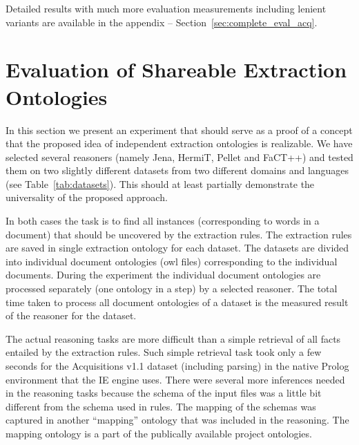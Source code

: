 Detailed results with much more evaluation measurements including lenient variants are available in the appendix -- Section~\ref{sec:complete_eval_acq}.






\section{Evaluation of Shareable Extraction Ontologies}  \label{sec:onto_experiment}

In this section we present an experiment that should serve as a proof of a concept that the proposed idea of independent extraction ontologies is realizable. We have selected several reasoners (namely Jena, HermiT, Pellet and FaCT++) and tested them on two slightly different datasets from two different domains and languages (see Table~\ref{tab:datasets}). This should at least partially demonstrate the universality of the proposed approach.

In both cases the task is to find all instances (corresponding to words in a document) that should be uncovered by the extraction rules. The extraction rules are saved in single extraction ontology for each dataset. The datasets are divided into individual document ontologies (owl files) corresponding to the individual documents. During the experiment the individual document ontologies are processed separately (one ontology in a step) by a selected reasoner. The total time taken to process all document ontologies of a dataset is the measured result of the reasoner for the dataset.

The actual reasoning tasks are more difficult than a simple retrieval of all facts entailed by the extraction rules. Such simple retrieval task took only a few seconds for the Acquisitions v1.1 dataset (including parsing) in the native Prolog environment that the IE engine uses. There were several more inferences needed in the reasoning tasks because the schema of the input files was a little bit different from the schema used in rules. The mapping of the schemas was captured in another ``mapping'' ontology that was included in the reasoning. The mapping ontology is a part of the publically available project ontologies.


